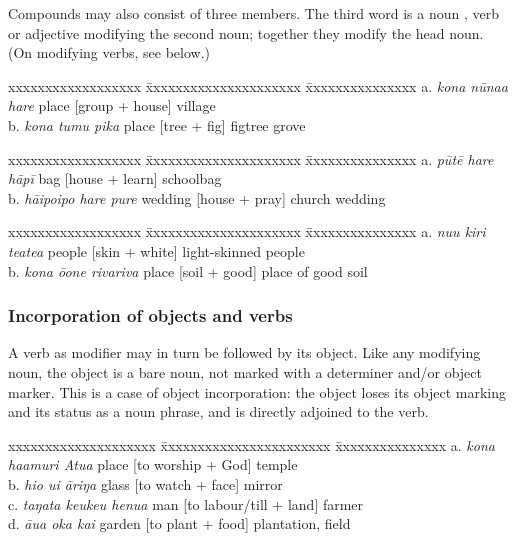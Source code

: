 Compounds may also consist of three members. The third word is a noun , verb  or adjective  modifying the second noun; together they modify the head noun. (On modifying verbs, see  below.)

\ea\label{ex:5.122}
\begin{tabbing}
xxxxxxxxxxxxxxxxxx \= xxxxxxxxxxxxxxxxxxxxx \= xxxxxxxxxxxxxxx \kill
  a. \textit{kona nūna{\ꞌ}a hare}   \> place [group + house]  \> village\\
  b. \textit{kona tumu pika}   \> place [tree + fig]  \> figtree grove
\end{tabbing}
\z

\ea\label{ex:5.123}
\begin{tabbing}
xxxxxxxxxxxxxxxxxx \= xxxxxxxxxxxxxxxxxxxxx \= xxxxxxxxxxxxxxx \kill
  a. \textit{pūtē hare hāpī}   \> bag [house + learn] \>  schoolbag\\
  b. \textit{hāipoipo hare pure}  \>  wedding [house + pray] \>  church wedding
\end{tabbing}
\z

\ea\label{ex:5.124}
\begin{tabbing}
xxxxxxxxxxxxxxxxxx \= xxxxxxxxxxxxxxxxxxxxx \= xxxxxxxxxxxxxxx \kill
  a. \textit{nu{\ꞌ}u kiri teatea} \> people  [skin + white] \>   light-skinned people\\
  b. \textit{kona {\ꞌ}ō{\ꞌ}one rivariva} \>  place [soil + good] \>  place of good soil
\end{tabbing}
\z

\subsubsection[Incorporation of objects and verbs]{Incorporation of objects and verbs}\label{sec:5.7.2.3}
A verb as modifier may in turn be followed by its object. Like any modifying noun, the object is a bare noun, not marked with a determiner and/or object marker. This is a case of object incorporation: the object loses its object marking and its status as a noun phrase, and is directly adjoined to the verb.

\ea\label{ex:5.125}
\begin{tabbing}
xxxxxxxxxxxxxxxxxxxx \= xxxxxxxxxxxxxxxxxxxxxxx \= xxxxxxxxxxxxxxx \kill
  a. \textit{kona ha{\ꞌ}amuri {\ꞌ}Atua} \> place [to worship + God]  \> temple\\
  b. \textit{hi{\ꞌ}o u{\ꞌ}i {\ꞌ}āriŋa} \> glass [to watch + face]  \> mirror\\
  c. \textit{taŋata keukeu henua} \> man [to labour/till + land]  \> farmer\\
  d. \textit{{\ꞌ}āua {\ꞌ}oka kai} \> garden [to plant + food]  \> plantation, field
\end{tabbing}
\z

